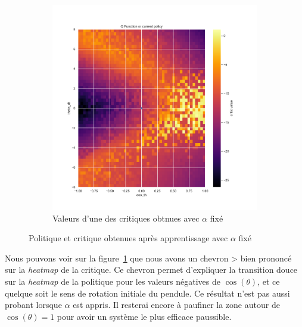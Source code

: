\begin{figure}[H]
\begin{subfigure}{0.45\textwidth}
        \includegraphics[width=\textwidth]{figures/sac_itr4/a_fixed/5_critic_pg_q2_post_Pendulum-v0.pdf}
        \caption{Valeurs d'une des critiques obtnues avec \(\alpha\) fixé}
    \end{subfigure}
    \caption{Politique et critique obtenues après apprentissage avec \(\alpha\) fixé}\label{fig:sac:heatmap4}
\end{figure}

Nous pouvons voir sur la figure~\ref{fig:sac:heatmap4} que nous avons un chevron > bien prononcé sur la \emph{heatmap} de la critique. Ce chevron permet d'expliquer la transition douce sur la \emph{heatmap} de la politique pour les valeurs négatives de \(\cos(\theta)\), et ce quelque soit le sens de rotation initiale du pendule. Ce résultat n'est pas aussi probant lorsque \(\alpha\) est appris. Il resterai encore à paufiner la zone autour de \(\cos(\theta) = 1\) pour avoir un système le plus efficace paussible.